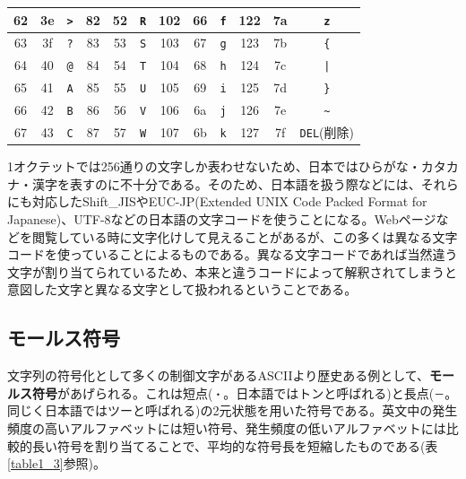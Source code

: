 \begin{table}
\begin{tabular}{|c|c|c||c|c|c||c|c|c||c|c|c|}
62&3e&\verb|>|&82&52&\verb|R|&102&66&\verb|f|&122&7a&\verb|z|\\ \hline
63&3f&\verb|?|&83&53&\verb|S|&103&67&\verb|g|&123&7b&\verb|{|\\ \hline
64&40&\verb|@|&84&54&\verb|T|&104&68&\verb|h|&124&7c&\verb`|`\\ \hline
65&41&\verb|A|&85&55&\verb|U|&105&69&\verb|i|&125&7d&\verb|}|\\ \hline
66&42&\verb|B|&86&56&\verb|V|&106&6a&\verb|j|&126&7e&\verb|~|\\ \hline
67&43&\verb|C|&87&57&\verb|W|&107&6b&\verb|k|&127&7f&\verb|DEL|{\scriptsize (削除)}\\ \hline
\end{tabular}
\end{table}

1オクテットでは256通りの文字しか表わせないため、日本ではひらがな・カタカナ・漢字を表すのに不十分である。そのため、日本語を扱う際などには、それらにも対応したShift\_JISやEUC-JP(Extended UNIX Code Packed Format for Japanese)、UTF-8などの日本語の文字コードを使うことになる。Webページなどを閲覧している時に文字化けして見えることがあるが、この多くは異なる文字コードを使っていることによるものである。異なる文字コードであれば当然違う文字が割り当てられているため、本来と違うコードによって解釈されてしまうと意図した文字と異なる文字として扱われるということである。

\subsection{モールス符号}
文字列の符号化として多くの制御文字があるASCIIより歴史ある例として、\textbf{モールス符号}があげられる。これは短点(\verb|・|。日本語ではトンと呼ばれる)と長点(\verb|－|。同じく日本語ではツーと呼ばれる)の2元状態を用いた符号である。英文中の発生頻度の高いアルファベットには短い符号、発生頻度の低いアルファベットには比較的長い符号を割り当てることで、平均的な符号長を短縮したものである(表\ref{table1_3}参照)。


